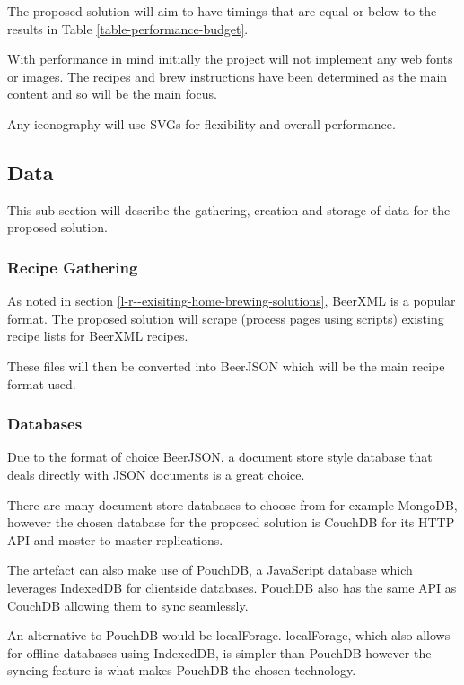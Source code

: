 The proposed solution will aim to have timings that are equal or below to the results in Table \ref{table-performance-budget}.

With performance in mind initially the project will not implement any web fonts or images. The recipes and brew instructions have been determined as the main content and so will be the main focus.

Any iconography will use SVGs for flexibility and overall performance.

\subsection{Data} \label{a-d--data}

This sub-section will describe the gathering, creation and storage of data for the proposed solution.

\subsubsection{Recipe Gathering} \label{a-d--d--recipe-gathering}

As noted in section \ref{l-r--exisiting-home-brewing-solutions}, BeerXML is a popular format.
The proposed solution will scrape (process pages using scripts) existing recipe lists for BeerXML recipes.

These files will then be converted into BeerJSON which will be the main recipe format used.

\subsubsection{Databases} \label{a-d--d--databases}

Due to the format of choice BeerJSON, a document store style database that deals directly with JSON documents is a great choice.

There are many document store databases to choose from for example MongoDB, however the chosen database for the proposed solution is CouchDB for its HTTP API and master-to-master replications. \cite{couchdb}

The artefact can also make use of PouchDB, a JavaScript database which leverages IndexedDB for clientside databases. PouchDB also has the same API as CouchDB allowing them to sync seamlessly.

An alternative to PouchDB would be localForage. localForage, which also allows for offline databases using IndexedDB, is simpler than PouchDB however the syncing feature is what makes PouchDB the chosen technology.

